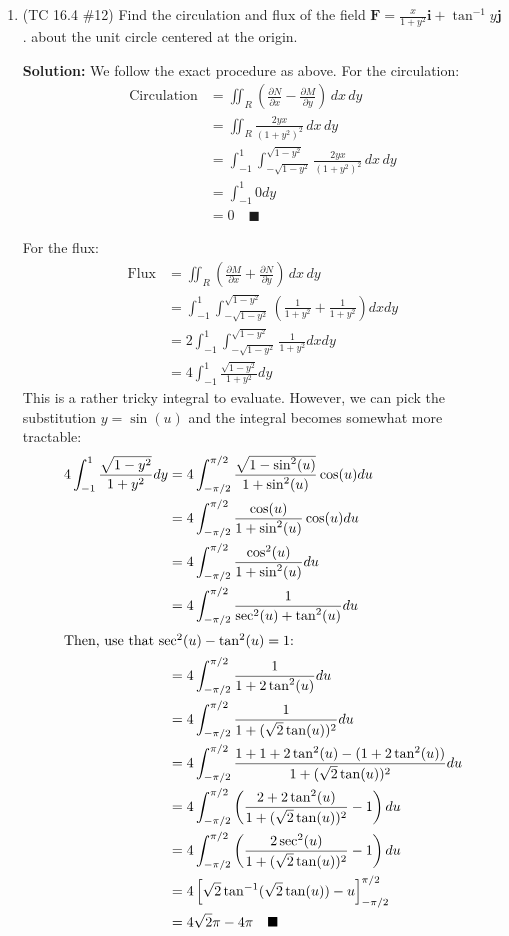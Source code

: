 \documentclass[letterpaper, 11pt]{article}
\begin{document}
\begin{enumerate}
\item (TC 16.4 \#12) Find the circulation and flux of the field $\bm{F} = \frac{x}{1 + y^2} \bm{i} + \tan^{-1}y \bm{j}$. about the unit circle centered at the origin. 

\par \textbf{Solution:} We follow the exact procedure as above. For the circulation:
\begin{align*}
\text{Circulation} &= \iint_{R} \left( \frac{\partial N}{\partial x} - \frac{\partial M}{\partial y} \right)\, dx\, dy \\
&=  \iint_R  \frac{2yx}{ (1 + y^2)^2 } \, dx\, dy \\
&= \int_{-1}^1 \int_{-\sqrt{1 - y^2}}^{\sqrt{1 -y^2}} \frac{2yx}{ (1 + y^2)^2 } \, dx\, dy \\
&= \int_{-1}^1 0 dy \\
&= 0 \quad\blacksquare
\end{align*}

For the flux:
\begin{align*}
\text{Flux} &= \iint_R \left( \frac{\partial M}{\partial x} + \frac{\partial N}{\partial y} \right)\, dx\, dy \\
&= \int_{-1}^1 \int_{-\sqrt{1 - y^2}}^{\sqrt{1 -y^2}} \left( \frac{1}{1 + y^2} + \frac{1}{1 + y^2} \right) dx dy \\
&= 2 \int_{-1}^1 \int_{-\sqrt{1 - y^2}}^{\sqrt{1 -y^2}} \frac{1}{1 + y^2} dx dy\\
&= 4 \int_{-1}^1\frac{\sqrt{1 - y^2}}{ 1 + y^2} dy 
\end{align*}
This is a rather tricky integral to evaluate. However, we can pick the substitution $ y = \sin(u)$ and the integral becomes somewhat more tractable:
\begin{align*}
4 \int_{-1}^1\frac{\sqrt{1 - y^2}}{ 1 + y^2} dy &= 4 \int_{-\pi/2}^{ \pi/2} \frac{\sqrt{1 - \sin^2(u)}}{ 1 + \sin^2(u)} \cos (u) du \\
&= 4 \int_{-\pi/2}^{ \pi/2} \frac{\cos(u) }{ 1 + \sin^2(u)} \cos (u) du \\
&= 4\int_{-\pi/2}^{ \pi/2} \frac{ \cos^2 (u)}{ 1 + \sin^2 (u)} du \\
&= 4 \int_{-\pi/2}^{\pi/2} \frac{1}{\sec^2(u) +\tan^2(u)} du \\
\intertext{Then, use that $\sec^2(u) -\tan^2(u) = 1$:}
&= 4 \int_{-\pi/2}^{\pi/2} \frac{1}{ 1 + 2 \tan^2(u)} du \\
&= 4 \int_{-\pi/2}^{\pi/2} \frac{1}{ 1 + (\sqrt{2} \tan(u))^2} du  \\
&= 4 \int_{-\pi/2}^{\pi/2} \frac{1+ 1 + 2 \tan^2(u) - (1 + 2 \tan^2(u))}{ 1 + (\sqrt{2} \tan(u))^2} du  \\
&= 4 \int_{-\pi/2}^{\pi/2}\left(  \frac{2 + 2 \tan^2(u)}{ 1 + (\sqrt{2} \tan(u))^2}  - 1\right) du  \\
&= 4 \int_{-\pi/2}^{\pi/2}\left(  \frac{2 \sec^2(u)}{ 1 + (\sqrt{2} \tan(u))^2}  - 1\right) du  \\
&= 4 \left[ \sqrt{2} \tan^{-1}(\sqrt{2}\tan(u)) - u \right]_{-\pi/2}^{\pi/2} \\
&= 4 \sqrt{2} \pi - 4 \pi \quad\blacksquare
\end{align*}

\end{enumerate}
\end{document}
